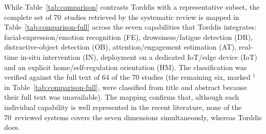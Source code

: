 While Table~\ref{tab:comparison} contrasts Torddis with a representative subset, the complete set of 70~studies retrieved by the systematic review is mapped in Table~\ref{tab:comparison-full} across the seven capabilities that Torddis integrates: facial-expression/emotion recognition (FE), drowsiness/fatigue detection (DR), distractive-object detection (OB), attention/engagement estimation (AT), real-time in-situ intervention (IN), deployment on a dedicated IoT/edge device (IoT) and an explicit home/self-regulation orientation (HM). The classification was verified against the full text of 64 of the 70 studies (the remaining six, marked $^{\dagger}$ in Table~\ref{tab:comparison-full}, were classified from title and abstract because their full text was unavailable). The mapping confirms that, although each individual capability is well represented in the recent literature, none of the 70~reviewed systems covers the seven dimensions simultaneously, whereas Torddis does.

